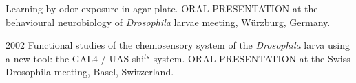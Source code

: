 \begin{itemize}
\begin{sloppypar}

Learning by odor exposure in agar plate.
ORAL PRESENTATION at the
behavioural neurobiology of \textit{Drosophila} larvae meeting, W\"{u}rzburg,
Germany.


\item[2002]
Functional studies of the chemosensory system of the
\textit{Drosophila} larva  using a new tool: the GAL4 / UAS-shi$^{ts}$ system.
ORAL PRESENTATION at the Swiss Drosophila meeting, Basel, Switzerland.


\end{sloppypar}
\end{itemize}





